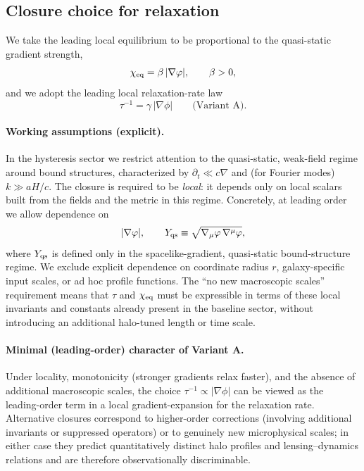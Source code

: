 \documentclass[11pt]{article}
\begin{document}
\subsection{Closure choice for relaxation}
We take the leading local equilibrium to be proportional to the quasi-static gradient strength,
\begin{equation}
\chi_{\rm eq}=\beta\,|\nabla\phi|,\qquad \beta>0,
\label{eq:chieq}
\end{equation}
and we adopt the leading local relaxation-rate law
\begin{equation}
\tau^{-1} = \gamma\,|\nabla\phi|\qquad \text{(Variant A)}.
\label{eq:chi2}
\end{equation}

\paragraph{Working assumptions (explicit).}
In the hysteresis sector we restrict attention to the quasi-static, weak-field regime around bound structures, characterized by $\partial_t \ll c\nabla$ and (for Fourier modes) $k\gg aH/c$. The closure is required to be \emph{local}: it depends only on local scalars built from the fields and the metric in this regime. Concretely, at leading order we allow dependence on
\begin{equation}
|\nabla\phi|,\qquad
Y_{\rm qs}\equiv \sqrt{\nabla_\mu\phi\,\nabla^\mu\phi},
\end{equation}
where $Y_{\rm qs}$ is defined only in the spacelike-gradient,
quasi-static bound-structure regime.  We exclude explicit dependence
on coordinate radius $r$, galaxy-specific input scales, or ad hoc
profile functions. The ``no new macroscopic scales'' requirement means
that $\tau$ and $\chi_{\rm eq}$ must be expressible in terms of these
local invariants and constants already present in the baseline sector,
without introducing an additional halo-tuned length or time scale.

\paragraph{Minimal (leading-order) character of Variant A.}
Under locality, monotonicity (stronger gradients relax faster), and the absence of additional macroscopic scales, the choice $\tau^{-1}\propto|\nabla\phi|$ can be viewed as the leading-order term in a local gradient-expansion for the relaxation rate. Alternative closures correspond to higher-order corrections (involving additional invariants or suppressed operators) or to genuinely new microphysical scales; in either case they predict quantitatively distinct halo profiles and lensing--dynamics relations and are therefore observationally discriminable.
\end{document}
